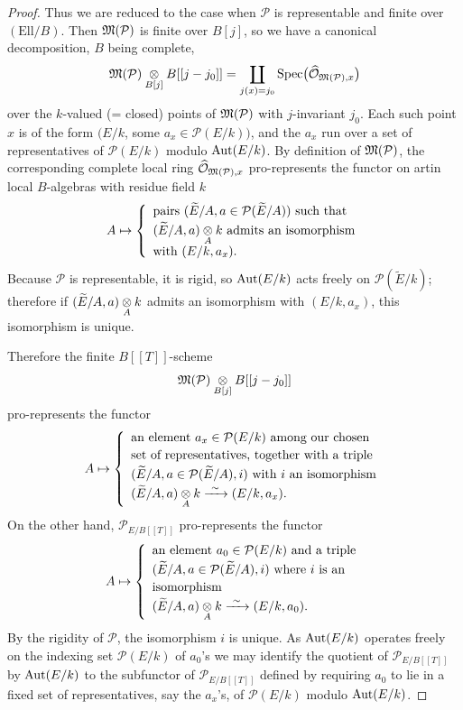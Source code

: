 \begin{proof}
Thus we are reduced to the case when $\mathcal{P}$ is representable and finite over $(\mathrm{Ell}/B)$. Then $\mathfrak{M}(\mathcal{P})$ is finite over $B[j]$, so we have a canonical decomposition, $B$ being complete,
\[
\mathfrak{M}(\mathcal{P}) \underset{B[j]}{\otimes} B[[j - j_0]] = \coprod_{j(x)=j_0} \operatorname{Spec}\bigl(\widehat{\mathcal{O}}_{\mathfrak{M}(\mathcal{P}), x}\bigr)
\]
over the $k$-valued (= closed) points of $\mathfrak{M}(\mathcal{P})$ with $j$-invariant $j_0$. Each such point $x$ is of the form $(E/k$, some $a_x \in \mathcal{P}(E/k))$, and the $a_x$ run over a set of representatives of $\mathcal{P}(E/k)$ modulo $\operatorname{Aut}(E/k)$. By definition of $\mathfrak{M}(\mathcal{P})$, the corresponding complete local ring $\widehat{\mathcal{O}}_{\mathfrak{M}(\mathcal{P}), x}$ pro-represents the functor on artin local $B$-algebras with residue field $k$
\[
A \mapsto
\left\{
\begin{array}{l}
\text{pairs } (\widetilde{E}/A, a \in \mathcal{P}(\widetilde{E}/A)) \text{ such that} \\[2pt]
(\widetilde{E}/A, a) \underset{A}{\otimes} k \text{ admits an isomorphism} \\[2pt]
\text{with } (E/k, a_x) .
\end{array}
\right.
\]
Because $\mathcal{P}$ is representable, it is rigid, so $\operatorname{Aut}(E/k)$ acts freely on $\mathcal{P}(\widetilde{E}/k)$; therefore if $(\widetilde{E}/A, a) \underset{A}{\otimes} k$ admits an isomorphism with $(E/k, a_x)$, this isomorphism is unique.

Therefore the finite $B[[T]]$-scheme
\[
\mathfrak{M}(\mathcal{P}) \underset{B[j]}{\otimes} B[[j - j_0]]
\]
pro-represents the functor
\[
A \mapsto
\left\{
\begin{array}{l}
\text{an element } a_x \in \mathcal{P}(E/k) \text{ among our chosen} \\[2pt]
\text{set of representatives, together with a triple} \\[2pt]
(\widetilde{E}/A, a \in \mathcal{P}(\widetilde{E}/A), i) \text{ with } i \text{ an isomorphism} \\[2pt]
(\widetilde{E}/A, a) \underset{A}{\otimes} k \xrightarrow{\ \sim\ } (E/k, a_x) .
\end{array}
\right.
\]
On the other hand, $\mathcal{P}_{E/B[[T]]}$ pro-represents the functor
\[
A \mapsto
\left\{
\begin{array}{l}
\text{an element } a_0 \in \mathcal{P}(E/k) \text{ and a triple} \\[2pt]
(\widetilde{E}/A, a \in \mathcal{P}(\widetilde{E}/A), i) \text{ where } i \text{ is an} \\[2pt]
\text{isomorphism} \\[2pt]
(\widetilde{E}/A, a) \underset{A}{\otimes} k \xrightarrow{\ \sim\ } (E/k, a_0) .
\end{array}
\right.
\]
By the rigidity of $\mathcal{P}$, the isomorphism $i$ is unique. As $\operatorname{Aut}(E/k)$ operates freely on the indexing set $\mathcal{P}(E/k)$ of $a_0$'s we may identify the quotient of $\mathcal{P}_{E/B[[T]]}$ by $\operatorname{Aut}(E/k)$ to the subfunctor of $\mathcal{P}_{E/B[[T]]}$ defined by requiring $a_0$ to lie in a fixed set of representatives, say the $a_x$'s, of $\mathcal{P}(E/k)$ modulo $\operatorname{Aut}(E/k)$.
\end{proof}

